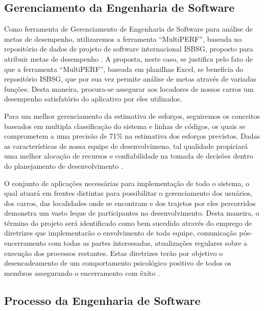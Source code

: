 \documentclass[12pt]{article}
\begin{document}
\subsection{Gerenciamento da Engenharia de Software}

Como ferramenta de Gerenciamento de Engenharia de Software para análise de metas de desempenho, utilizaremos a ferramenta “MultiPERF”, baseada no repositório de dados de projeto de software internacional ISBSG, proposto para atribuir metas de desempenho \cite{Stroian2014}. A proposta, neste caso, se justifica pelo fato de que a ferramenta “MultiPERF”, baseada em planilhas Excel, se beneficia do repositório ISBSG, que por sua vez permite análise de metas através de variadas funções. Desta maneira, procura-se assegurar aos locadores de nossos carros um desempenho satisfatório do aplicativo por eles utilizados.

Para um melhor gerenciamento da estimativa de esforços, seguiremos os conceitos baseados em multipla classificação do sistema e linhas de códigos, os quais se comprometem a uma precisão de 71\% na estimativa dos esforços previstos. Dadas as características de nossa equipe de desenvolvimeno, tal qualidade propiciará uma melhor alocação de recursos e confiabilidade na tomada de decisões dentro do planejamento de desenvolvimento \cite{Velarde2016}. 

O conjunto de aplicações necessárias para implementação de todo o sistema, o qual atuará em frentes distintas para possibilitar o gerenciamento dos usuários, dos carros, das localidades onde se encontram e dos trajetos por eles percorridos demonstra um vasto leque de participantes no desenvolvimento. Desta maneira, o término do projeto será identificado como bem sucedido através do emprego de diretrizes que implementarão o envolvimento de toda equipe, comunicação pós-encerramento com todas as partes interessadas, atualizações regulares sobre a execução dos processos restantes. Estas diretrizes terão por objetivo o desencadeamento de um comportamento psicológico positivo de todos os membros assegurando o encerramento com êxito \cite{Sarfraz2009}.


\subsection{Processo da Engenharia de Software}
\end{document}
